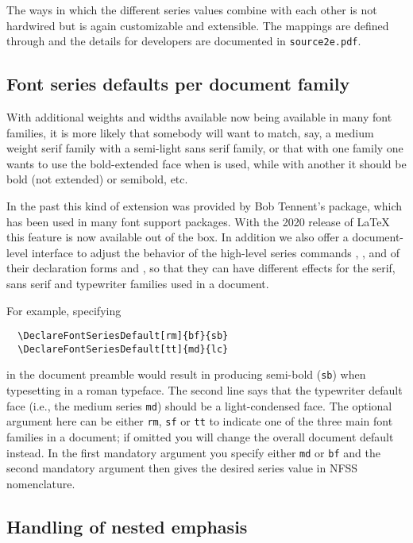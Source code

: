 \documentclass{ltnews}
\begin{document}
The ways in which the different series values combine with each other is not
hardwired but is again customizable and extensible. The mappings are
defined through  and the details for
developers are documented in \texttt{source2e.pdf}.


\subsection{Font series defaults per document family}

With additional weights and widths available now being available in
many font families, it is more likely that somebody will want to
match, say, a medium weight serif family with a semi-light sans serif
family, or that with one family one wants to use the bold-extended
face when  is used, while with another it should be bold
(not extended) or semibold, etc.

In the past this kind of extension was provided by Bob Tennent's 
 package, which has been used in many font
support packages.
With the 2020 release of \LaTeX{} this feature is now available out
of the box.  In addition we also offer a document-level interface to adjust the
behavior of the high-level series commands , , and of their
declaration forms  and , so that they can
have different effects for the serif, sans serif and typewriter
families used in a document.

For example, specifying
\begin{verbatim}
  \DeclareFontSeriesDefault[rm]{bf}{sb}
  \DeclareFontSeriesDefault[tt]{md}{lc}
\end{verbatim}
in the document preamble would result in  producing
semi-bold (\texttt{sb}) when typesetting in a roman typeface.
The second line says that the 
typewriter default face (i.e., the medium series \texttt{md}) should be
a light-condensed face. The optional argument here can be either
\texttt{rm}, \texttt{sf} or \texttt{tt} to indicate one of the three
main font families in a document; if omitted you will change the
overall document default instead.  In the first mandatory argument you
specify either \texttt{md} or \texttt{bf} and the second mandatory
argument then gives the desired series value in NFSS nomenclature.


\subsection{Handling of nested emphasis}
\end{document}
